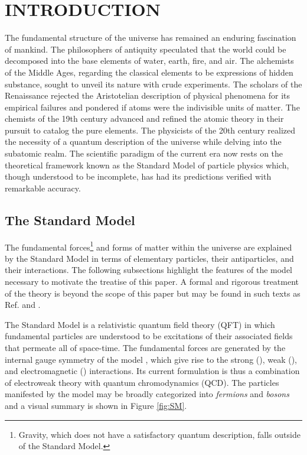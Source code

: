 \chapter{INTRODUCTION} \label{intro}

The fundamental structure of the universe has remained an enduring fascination of mankind. The philosophers of antiquity speculated that the world could be decomposed into the base elements of water, earth, fire, and air. The alchemists of the Middle Ages, regarding the classical elements to be expressions of hidden substance, sought to unveil its nature with crude experiments. The scholars of the Renaissance rejected the Aristotelian description of physical phenomena for its empirical failures and pondered if atoms were the indivisible units of matter. The chemists of the 19th century advanced and refined the atomic theory in their pursuit to catalog the pure elements. The physicists of the 20th century realized the necessity of a quantum description of the universe while delving into the subatomic realm. The scientific paradigm of the current era now rests on the theoretical framework known as the Standard Model of particle physics which, though understood to be incomplete, has had its predictions verified with remarkable accuracy.

\section{The Standard Model}

The fundamental forces\footnote{Gravity, which does not have a satisfactory quantum description, falls outside of the Standard Model.} and forms of matter within the universe are explained by the Standard Model in terms of elementary particles, their antiparticles, and their interactions. The following subsections highlight the features of the model necessary to motivate the treatise of this paper. A formal and rigorous treatment of the theory is beyond the scope of this paper but may be found in such texts as Ref. \cite{Peskin} and \cite{Schwartz}.

The Standard Model is a relativistic quantum field theory (QFT) in which fundamental particles are understood to be excitations of their associated fields that permeate all of space-time. The fundamental forces are generated by the internal gauge symmetry of the model \symSM, which give rise to the strong (\symSTRONG), weak (\symWEAK), and electromagnetic (\symEM) interactions. Its current formulation is thus a combination of electroweak theory with quantum chromodynamics (QCD). The particles manifested by the model may be broadly categorized into \textit{fermions} and \textit{bosons} and a visual summary is shown in Figure \ref{fig:SM}.

